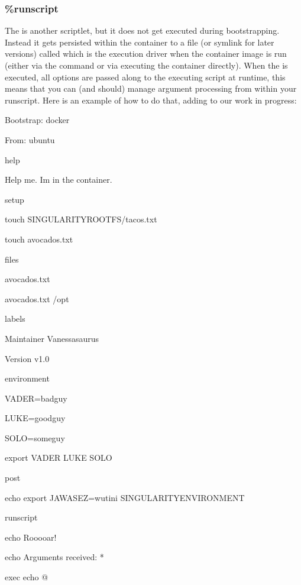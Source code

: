 \documentclass[letterpaper,10pt,english]{sphinxmanual}
\begin{document}
\subsubsection{\%runscript}
\label{\detokenize{container_recipes:runscript}}\label{\detokenize{container_recipes:id2}}\label{\detokenize{container_recipes:sec-runscript}}
The  is another scriptlet, but it does not get executed during
bootstrapping. Instead it gets persisted within the container to a
file (or symlink for later versions) called  which is the execution
driver when the container image is run (either via the  command or via
executing the container directly).
When the  is executed, all options are passed along to the executing
script at runtime, this means that you can (and should) manage
argument processing from within your runscript. Here is an example of
how to do that, adding to our work in progress:

%
\begin{sphinxVerbatim}[commandchars=\\\{\}]
Bootstrap: docker

From: ubuntu


\PYGZpc{}help

Help me. I\PYGZsq{}m in the container.


\PYGZpc{}setup

    touch \PYGZdl{}\PYGZob{}SINGULARITY\PYGZus{}ROOTFS\PYGZcb{}/tacos.txt

    touch avocados.txt


\PYGZpc{}files

    avocados.txt

    avocados.txt /opt


\PYGZpc{}labels

    Maintainer Vanessasaurus

    Version v1.0


\PYGZpc{}environment

    VADER=badguy

    LUKE=goodguy

    SOLO=someguy

    export VADER LUKE SOLO



\PYGZpc{}post

    echo \PYGZsq{}export JAWA\PYGZus{}SEZ=wutini\PYGZsq{} \PYGZgt{}\PYGZgt{} \PYGZdl{}SINGULARITY\PYGZus{}ENVIRONMENT


\PYGZpc{}runscript

    echo \PYGZdq{}Rooooar!\PYGZdq{}

    echo \PYGZdq{}Arguments received: \PYGZdl{}*\PYGZdq{}

    exec echo \PYGZdq{}\PYGZdl{}@\PYGZdq{}
\end{sphinxVerbatim}
\end{document}
